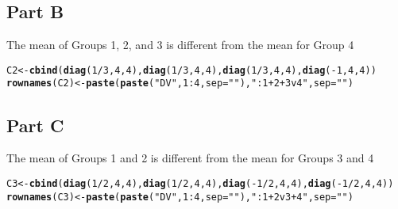 \documentclass{article}\usepackage[]{graphicx}\usepackage[]{color}
\makeatletter
\newcommand{\hlnum}[1]{\textcolor[rgb]{0.686,0.059,0.569}{#1}}%
\newcommand{\hlstr}[1]{\textcolor[rgb]{0.192,0.494,0.8}{#1}}%
\newcommand{\hlopt}[1]{\textcolor[rgb]{0,0,0}{#1}}%
\newcommand{\hlstd}[1]{\textcolor[rgb]{0.345,0.345,0.345}{#1}}%
\newcommand{\hlkwb}[1]{\textcolor[rgb]{0.69,0.353,0.396}{#1}}%
\newcommand{\hlkwc}[1]{\textcolor[rgb]{0.333,0.667,0.333}{#1}}%
\newcommand{\hlkwd}[1]{\textcolor[rgb]{0.737,0.353,0.396}{\textbf{#1}}}%
\newenvironment{kframe}{%
 \def\at@end@of@kframe{}%
 \ifinner\ifhmode%
  \def\at@end@of@kframe{\end{minipage}}%
  \begin{minipage}{\columnwidth}%
 \fi\fi%
 \def\FrameCommand##1{\hskip\@totalleftmargin \hskip-\fboxsep
 \colorbox{shadecolor}{##1}\hskip-\fboxsep
     \hskip-\linewidth \hskip-\@totalleftmargin \hskip\columnwidth}%
 \MakeFramed {\advance\hsize-\width
   \@totalleftmargin\z@ \linewidth\hsize
   \@setminipage}}%
 {\par\unskip\endMakeFramed%
 \at@end@of@kframe}
\newenvironment{knitrout}{}{} %
\makeatother
\begin{document}
\subsection{Part B}
The mean of Groups 1, 2, and 3 is different from the mean for Group 4
\begin{knitrout}
\color{fgcolor}\begin{kframe}
\begin{alltt}
\hlstd{C2} \hlkwb{<-} \hlkwd{cbind}\hlstd{(}\hlkwd{diag}\hlstd{(}\hlnum{1}\hlopt{/}\hlnum{3}\hlstd{,} \hlnum{4}\hlstd{,} \hlnum{4}\hlstd{),} \hlkwd{diag}\hlstd{(}\hlnum{1}\hlopt{/}\hlnum{3}\hlstd{,} \hlnum{4}\hlstd{,} \hlnum{4}\hlstd{),} \hlkwd{diag}\hlstd{(}\hlnum{1}\hlopt{/}\hlnum{3}\hlstd{,} \hlnum{4}\hlstd{,} \hlnum{4}\hlstd{),} \hlkwd{diag}\hlstd{(}\hlopt{-}\hlnum{1}\hlstd{,}\hlnum{4}\hlstd{,}\hlnum{4}\hlstd{))}
\hlkwd{rownames}\hlstd{(C2)} \hlkwb{<-} \hlkwd{paste}\hlstd{(}\hlkwd{paste}\hlstd{(}\hlstr{"DV"}\hlstd{,} \hlnum{1}\hlopt{:}\hlnum{4}\hlstd{,} \hlkwc{sep} \hlstd{=} \hlstr{""}\hlstd{),} \hlstr{": 1+2+3 v 4"}\hlstd{,} \hlkwc{sep} \hlstd{=} \hlstr{""}\hlstd{)}
\end{alltt}
\end{kframe}
\end{knitrout}


\subsection{Part C}
The mean of Groups 1 and 2 is different from the mean for Groups 3 and 4
\begin{knitrout}
\color{fgcolor}\begin{kframe}
\begin{alltt}
\hlstd{C3} \hlkwb{<-} \hlkwd{cbind}\hlstd{(}\hlkwd{diag}\hlstd{(}\hlnum{1}\hlopt{/}\hlnum{2}\hlstd{,} \hlnum{4}\hlstd{,} \hlnum{4}\hlstd{),} \hlkwd{diag}\hlstd{(}\hlnum{1}\hlopt{/}\hlnum{2}\hlstd{,} \hlnum{4}\hlstd{,} \hlnum{4}\hlstd{),} \hlkwd{diag}\hlstd{(}\hlopt{-}\hlnum{1}\hlopt{/}\hlnum{2}\hlstd{,} \hlnum{4}\hlstd{,} \hlnum{4}\hlstd{),} \hlkwd{diag}\hlstd{(}\hlopt{-}\hlnum{1}\hlopt{/}\hlnum{2}\hlstd{,}\hlnum{4}\hlstd{,}\hlnum{4}\hlstd{))}
\hlkwd{rownames}\hlstd{(C3)} \hlkwb{<-} \hlkwd{paste}\hlstd{(}\hlkwd{paste}\hlstd{(}\hlstr{"DV"}\hlstd{,} \hlnum{1}\hlopt{:}\hlnum{4}\hlstd{,} \hlkwc{sep} \hlstd{=} \hlstr{""}\hlstd{),} \hlstr{": 1+2 v 3+4"}\hlstd{,} \hlkwc{sep} \hlstd{=} \hlstr{""}\hlstd{)}
\end{alltt}
\end{kframe}
\end{knitrout}
\end{document}
